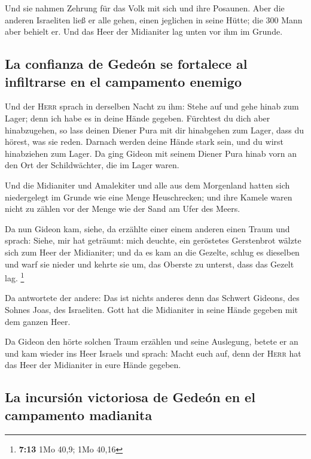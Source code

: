  Und sie nahmen Zehrung für das Volk mit sich und ihre
Posaunen. Aber die anderen Israeliten ließ er alle gehen, einen
jeglichen in seine Hütte; die 300 Mann aber behielt er. Und das Heer der
Midianiter lag unten vor ihm im Grunde.

\hypertarget{la-confianza-de-gedeuxf3n-se-fortalece-al-infiltrarse-en-el-campamento-enemigo}{%
\subsection{La confianza de Gedeón se fortalece al infiltrarse en el
campamento
enemigo}\label{la-confianza-de-gedeuxf3n-se-fortalece-al-infiltrarse-en-el-campamento-enemigo}}

 Und der \textsc{Herr} sprach in derselben Nacht zu ihm:
Stehe auf und gehe hinab zum Lager; denn ich habe es in deine Hände
gegeben.  Fürchtest du dich aber hinabzugehen, so lass
deinen Diener Pura mit dir hinabgehen zum Lager,  dass du
hörest, was sie reden. Darnach werden deine Hände stark sein, und du
wirst hinabziehen zum Lager. Da ging Gideon mit seinem Diener Pura hinab
vorn an den Ort der Schildwächter, die im Lager waren.

 Und die Midianiter und Amalekiter und alle aus dem
Morgenland hatten sich niedergelegt im Grunde wie eine Menge
Heuschrecken; und ihre Kamele waren nicht zu zählen vor der Menge wie
der Sand am Ufer des Meers.

 Da nun Gideon kam, siehe, da erzählte einer einem
anderen einen Traum und sprach: Siehe, mir hat geträumt: mich deuchte,
ein geröstetes Gerstenbrot wälzte sich zum Heer der Midianiter; und da
es kam an die Gezelte, schlug es dieselben und warf sie nieder und
kehrte sie um, das Oberste zu unterst, dass das Gezelt lag. \footnote{\textbf{7:13}
  1Mo 40,9; 1Mo 40,16}

 Da antwortete der andere: Das ist nichts anderes denn
das Schwert Gideons, des Sohnes Joas, des Israeliten. Gott hat die
Midianiter in seine Hände gegeben mit dem ganzen Heer.

 Da Gideon den hörte solchen Traum erzählen und seine
Auslegung, betete er an und kam wieder ins Heer Israels und sprach:
Macht euch auf, denn der \textsc{Herr} hat das Heer der Midianiter in
eure Hände gegeben.

\hypertarget{la-incursiuxf3n-victoriosa-de-gedeuxf3n-en-el-campamento-madianita}{%
\subsection{La incursión victoriosa de Gedeón en el campamento
madianita}\label{la-incursiuxf3n-victoriosa-de-gedeuxf3n-en-el-campamento-madianita}}

